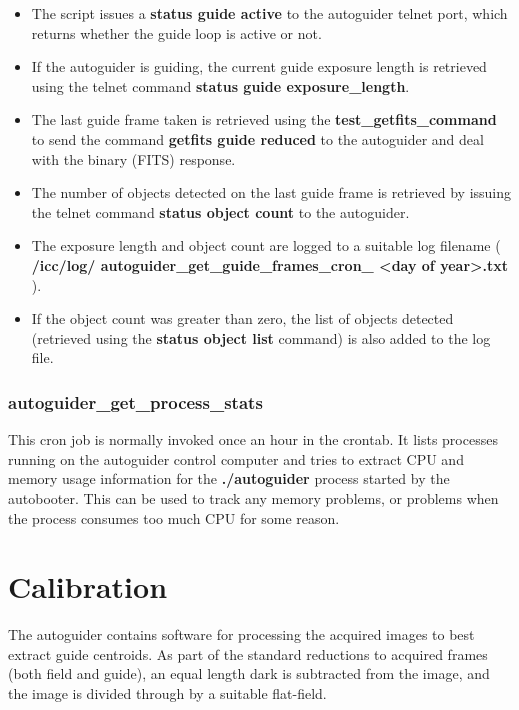 \documentclass[10pt,a4paper]{article}
\begin{document}
\begin{itemize}
\item The script issues a {\bf status guide active} to the autoguider telnet port, which returns whether the guide loop is active or not.
\item If the autoguider is guiding, the current guide exposure length is  retrieved using the telnet command {\bf status guide exposure\_length}. 
\item The last guide frame taken is retrieved using the {\bf test\_getfits\_command} to send the command {\bf getfits guide reduced} to the autoguider and deal with the binary (FITS) response.
\item The number of objects detected on the last guide frame is retrieved by issuing the telnet command {\bf status object count} to the autoguider.
\item The exposure length and object count are logged to a suitable log filename  ( {\bf /icc/log/ autoguider\_get\_guide\_frames\_cron\_ \textless day of year\textgreater .txt} ).
\item If the object count was greater than zero, the list of objects detected (retrieved using the {\bf status object list} command) is also added to the log file.
\end{itemize}

\subsubsection{autoguider\_get\_process\_stats}

This cron job is normally invoked once an hour in the crontab. It lists processes running on the autoguider control computer and tries to extract CPU and memory usage information for the {\bf ./autoguider} process started by the autobooter. This can be used to track any memory problems, or problems when the process consumes too much CPU for some reason.



\section{Calibration}

The autoguider contains software for processing the acquired images to best extract guide centroids. As part of the standard reductions to acquired frames (both field and guide), an equal length dark is subtracted from the image, and the image is divided through by a suitable flat-field.
\end{document}
